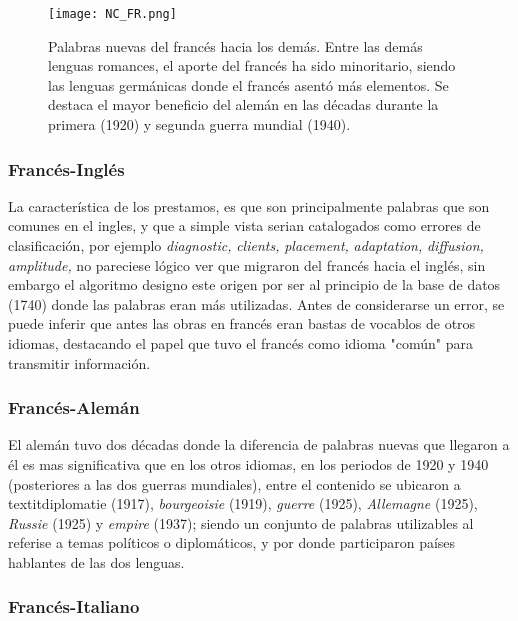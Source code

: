 {\begin{figure}[h!]
	\centering
	\texttt{[image: NC\_FR.png]}
	\label{fig.NC_FR}
	\caption{Palabras nuevas del francés hacia los demás. Entre las demás lenguas romances, el aporte del francés ha sido minoritario, siendo las lenguas germánicas donde el francés asentó más elementos. Se destaca el mayor beneficio del alemán en las décadas durante la primera (1920) y segunda guerra mundial (1940).}
	
	
\end{figure}

\subsubsection*{Francés-Inglés}%

La característica de los prestamos, es que son principalmente palabras que son comunes en el ingles, y que a simple vista serian catalogados como errores de clasificación, por ejemplo  \textit{diagnostic,} \textit{clients,} \textit{placement,} \textit{adaptation,} \textit{diffusion,} \textit{amplitude,} no pareciese lógico ver que migraron del francés hacia el inglés, sin embargo el algoritmo designo este origen por ser al principio de la base de datos (1740)  donde las palabras eran más utilizadas.  Antes de considerarse un error, se puede inferir que antes las obras en francés eran bastas de vocablos de otros idiomas, destacando el papel que tuvo el francés como idioma "común" para transmitir información. 


\subsubsection*{Francés-Alemán}%

El alemán tuvo dos décadas donde la diferencia de palabras nuevas que llegaron a él es mas significativa que en los otros idiomas, en los periodos de 1920 y 1940  (posteriores a las dos guerras mundiales), entre el contenido se ubicaron a  textit{diplomatie} (1917), \textit{bourgeoisie} (1919),  \textit{guerre} (1925), \textit{Allemagne} (1925), \textit{Russie} (1925) y \textit{empire} (1937); siendo un conjunto de palabras utilizables al referise a temas políticos  o diplomáticos, y por donde participaron países hablantes de las dos lenguas. 


\subsubsection*{Francés-Italiano}%

}
